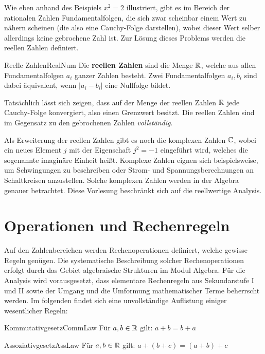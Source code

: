 Wie eben anhand des Beispiels $x^2=2$ illustriert, gibt es im Bereich der rationalen Zahlen Fundamentalfolgen, die sich zwar scheinbar einem Wert zu nähern scheinen (die also eine Cauchy-Folge darstellen),
wobei dieser Wert selber allerdings keine gebrochene Zahl ist. Zur Lösung dieses Problems werden die reellen Zahlen definiert.

\begin{definition}{Reelle Zahlen}{RealNum}
	Die \textbf{reellen Zahlen} sind die Menge $\mathbb{R}$, welche aus allen Fundamentalfolgen $a_i$ ganzer Zahlen besteht. Zwei Fundamentalfolgen $a_i, b_i$ sind dabei äquivalent, wenn $|a_i-b_i|$ eine Nullfolge bildet.
\end{definition}

Tatsächlich lässt sich zeigen, dass auf der Menge der reellen Zahlen $\mathbb{R}$ jede Cauchy-Folge konvergiert, also einen Grenzwert besitzt. Die reellen Zahlen sind im Gegensatz zu den gebrochenen Zahlen \emph{vollständig}.

Als Erweiterung der reellen Zahlen gibt es noch die komplexen Zahlen $\mathbb{C}$, wobei ein neues Element $j$ mit der Eigenschaft $j^2=-1$ eingeführt wird, welches die sogenannte imaginäre Einheit heißt. Komplexe
Zahlen eignen sich beispielsweise, um Schwingungen zu beschreiben oder Strom- und Spannungsberechnungen an Schaltkreisen anzustellen. Solche komplexen Zahlen werden in der Algebra genauer betrachtet. Diese Vorlesung beschränkt sich auf die reellwertige Analysis.

\section{Operationen und Rechenregeln}

Auf den Zahlenbereichen werden Rechenoperationen definiert, welche gewisse Regeln genügen. Die systematische Beschreibung solcher Rechenoperationen erfolgt durch das Gebiet algebraische Strukturen im Modul Algebra. Für die Analysis wird vorausgesetzt, dass elementare Rechenregeln aus Sekundarstufe I und II sowie der Umgang und die Umformung mathematischer Terme beherrscht werden. Im folgenden findet sich eine unvollständige Auflistung einiger wesentlicher Regeln:

\begin{statement}{Kommutativgesetz}{CommLaw}
	Für $a,b\in\mathbb{R}$ gilt: $a + b = b + a$
\end{statement}

\begin{statement}{Assoziativgesetz}{AssLaw}
	Für $a,b\in\mathbb{R}$ gilt: $a + ( b + c) = (a + b) + c$
\end{statement}

